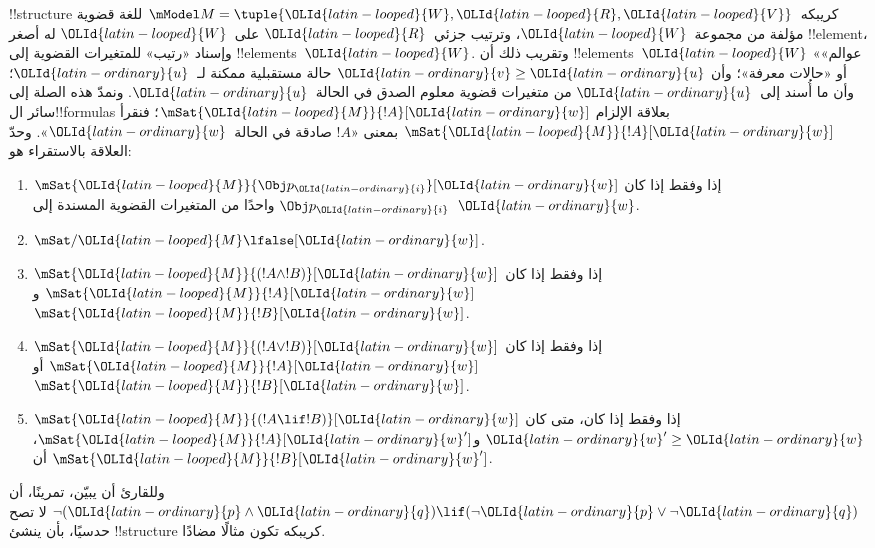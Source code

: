 \documentclass[../../../include/open-logic-section]{subfiles}
\begin{document}
!!{structure} كريبكه~$\mModel M = \tuple{{\OLId{latin-looped}{W}}, {\OLId{latin-looped}{R}}, {\OLId{latin-looped}{V}}}$ للغة قضوية
مؤلفة من مجموعة~${\OLId{latin-looped}{W}}$، وترتيب جزئي~${\OLId{latin-looped}{R}}$ على~${\OLId{latin-looped}{W}}$ له أصغر
!!{element}، وإسناد «رتيب» للمتغيرات القضوية إلى !!{element}s~${\OLId{latin-looped}{W}}$.
وتقريب ذلك أن !!{element}s~${\OLId{latin-looped}{W}}$ «عوالم» أو «حالات معرفة»؛
وأن ${\OLId{latin-ordinary}{v}} \geq {\OLId{latin-ordinary}{u}}$ حالة مستقبلية ممكنة لـ~${\OLId{latin-ordinary}{u}}$؛ وأن ما أُسند
إلى~${\OLId{latin-ordinary}{u}}$ من متغيرات قضوية معلوم الصدق في الحالة~${\OLId{latin-ordinary}{u}}$.
ونمدّ هذه الصلة إلى سائر ال!!{formula}s بعلاقة الإلزام
$\mSat{{\OLId{latin-looped}{M}}}{!A}[{\OLId{latin-ordinary}{w}}]$؛ فنقرأ $\mSat{{\OLId{latin-looped}{M}}}{!A}[{\OLId{latin-ordinary}{w}}]$ بمعنى
«$!A$ صادقة في الحالة~${\OLId{latin-ordinary}{w}}$». وحدّ العلاقة بالاستقراء هو:
\begin{enumerate}
\item $\mSat{{\OLId{latin-looped}{M}}}{\Obj p_{\OLId{latin-ordinary}{i}}}[{\OLId{latin-ordinary}{w}}]$ إذا وفقط إذا كان $\Obj p_{\OLId{latin-ordinary}{i}}$ واحدًا من
  المتغيرات القضوية المسندة إلى~${\OLId{latin-ordinary}{w}}$.
\item $\mSat/{{\OLId{latin-looped}{M}}}{\lfalse}[{\OLId{latin-ordinary}{w}}]$.
\item $\mSat{{\OLId{latin-looped}{M}}}{(!A \land !B)}[{\OLId{latin-ordinary}{w}}]$ إذا وفقط إذا كان
  $\mSat{{\OLId{latin-looped}{M}}}{!A}[{\OLId{latin-ordinary}{w}}]$ و$\mSat{{\OLId{latin-looped}{M}}}{!B}[{\OLId{latin-ordinary}{w}}]$.
\item $\mSat{{\OLId{latin-looped}{M}}}{(!A \lor !B)}[{\OLId{latin-ordinary}{w}}]$ إذا وفقط إذا كان
  $\mSat{{\OLId{latin-looped}{M}}}{!A}[{\OLId{latin-ordinary}{w}}]$ أو $\mSat{{\OLId{latin-looped}{M}}}{!B}[{\OLId{latin-ordinary}{w}}]$.
\item $\mSat{{\OLId{latin-looped}{M}}}{(!A \lif !B)}[{\OLId{latin-ordinary}{w}}]$ إذا وفقط إذا كان، متى كان
  ${\OLId{latin-ordinary}{w}}' \geq {\OLId{latin-ordinary}{w}}$ و$\mSat{{\OLId{latin-looped}{M}}}{!A}[{\OLId{latin-ordinary}{w}}']$، أن $\mSat{{\OLId{latin-looped}{M}}}{!B}[{\OLId{latin-ordinary}{w}}']$.
\end{enumerate}
وللقارئ أن يبيّن، تمرينًا، أن $\lnot ({\OLId{latin-ordinary}{p}} \land {\OLId{latin-ordinary}{q}}) \lif
(\lnot {\OLId{latin-ordinary}{p}} \lor \lnot {\OLId{latin-ordinary}{q}})$ لا تصح حدسيًا، بأن ينشئ !!{structure}
كريبكه تكون مثالًا مضادًا.
\end{document}
